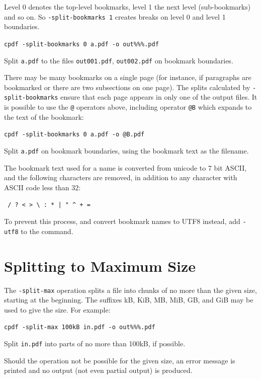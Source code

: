 \documentclass{book}
\begin{document}
Level 0 denotes the top-level bookmarks, level 1 the next level (sub-bookmarks)
and so on. So \texttt{-split-bookmarks 1} creates breaks on level 0 and level
1 boundaries.

  \begin{framed}\small
    \noindent\verb!cpdf -split-bookmarks 0 a.pdf -o out%%%.pdf!

    \vspace{2.5mm}
    \noindent Split \texttt{a.pdf} to the files \texttt{out001.pdf},
\texttt{out002.pdf} on bookmark boundaries.

  \end{framed}
\noindent There may be many bookmarks on a single page (for instance, if
paragraphs are bookmarked or there are two subsections on one page). The splits
calculated by \texttt{-split-bookmarks} ensure that each page appears in only
one of the output files.
  It is possible to use the \texttt{@} operators above, including operator \texttt{@B} which expands to the text of the bookmark:

  \begin{framed}\small
    \noindent\verb!cpdf -split-bookmarks 0 a.pdf -o @B.pdf!

    \vspace{2.5mm}
    \noindent Split \texttt{a.pdf} on bookmark boundaries, using the bookmark text as the filename.

  \end{framed}
\noindent The bookmark text used for a name is converted from unicode to 7 bit ASCII, and the following characters are removed, in addition to any character with ASCII code less than 32:
  \begin{framed}
  \centering
  \verb! / ? < > \ : * | " ^ + =!
  \end{framed}

\noindent To prevent this process, and convert bookmark names to UTF8 instead, add \texttt{-utf8} to the command.

\section{Splitting to Maximum Size}

The \texttt{-split-max} operation splits a file into chunks of no more than the given size, starting at the beginning. The suffixes kB, KiB, MB, MiB, GB, and GiB may be used to give the size. For example:

  \begin{framed}\small
    \noindent\verb!cpdf -split-max 100kB in.pdf -o out%%%.pdf!

    \vspace{2.5mm}
    \noindent Split \texttt{in.pdf} into parts of no more than 100kB, if possible.

  \end{framed}
\noindent Should the operation not be possible for the given size, an error message is printed and no output (not even partial output) is produced.
\end{document}
